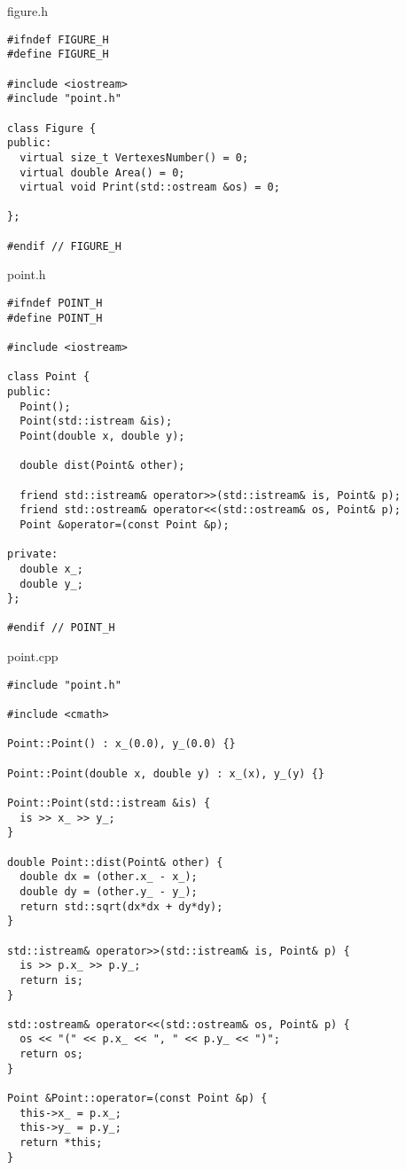 \documentclass[12pt]{article}
\begin{document}
{\Huge figure.h}
\begin{verbatim}
#ifndef FIGURE_H
#define FIGURE_H

#include <iostream>
#include "point.h"

class Figure {
public:
  virtual size_t VertexesNumber() = 0;
  virtual double Area() = 0;
  virtual void Print(std::ostream &os) = 0;

};

#endif // FIGURE_H

\end{verbatim}
    \pagebreak

\begin{flushleft}
{\Huge point.h}
\begin{verbatim}
#ifndef POINT_H
#define POINT_H

#include <iostream>

class Point {
public:
  Point();
  Point(std::istream &is);
  Point(double x, double y);

  double dist(Point& other);
  
  friend std::istream& operator>>(std::istream& is, Point& p);
  friend std::ostream& operator<<(std::ostream& os, Point& p);
  Point &operator=(const Point &p);

private:
  double x_;
  double y_;
};

#endif // POINT_H

\end{verbatim}
\end{flushleft}
    \pagebreak

\begin{flushleft}
{\Huge point.cpp}
\begin{verbatim}
#include "point.h"

#include <cmath>

Point::Point() : x_(0.0), y_(0.0) {}

Point::Point(double x, double y) : x_(x), y_(y) {}

Point::Point(std::istream &is) {
  is >> x_ >> y_;
}

double Point::dist(Point& other) {
  double dx = (other.x_ - x_);
  double dy = (other.y_ - y_);
  return std::sqrt(dx*dx + dy*dy);
}

std::istream& operator>>(std::istream& is, Point& p) {
  is >> p.x_ >> p.y_;
  return is;
}

std::ostream& operator<<(std::ostream& os, Point& p) {
  os << "(" << p.x_ << ", " << p.y_ << ")";
  return os;
}

Point &Point::operator=(const Point &p) {
  this->x_ = p.x_;
  this->y_ = p.y_;
  return *this;
}
\end{verbatim}
\end{flushleft}
    \pagebreak
\end{document}
